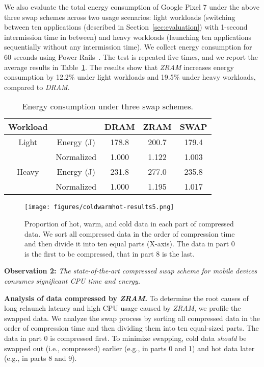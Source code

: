 We also evaluate the total energy consumption of Google Pixel 7 under the above three swap schemes across two usage scenarios: light workloads (switching between ten applications (described in Section~\ref{sec:evaluation}) with 1-second intermission time in between) and heavy workloads (launching ten applications sequentially without any intermission time). We collect energy consumption for 60 seconds using Power Rails~\cite{power-profiler}. The test is repeated five times, and we report the average results in Table~\ref{tab:energy}. The results show that  \emph{ZRAM} increases energy consumption by 12.2\% under light workloads and 19.5\% under heavy workloads, compared to \emph{DRAM}.
 
\begin{table}[h!]
\centering
\caption{Energy consumption under three swap schemes.}
\footnotesize
\begin{tabular}{c||c|c|c|c}
\hline
\textbf{Workload} & & \textbf{DRAM}& \textbf{ZRAM}& \textbf{SWAP}\\ \hline
\hline
Light &Energy (J)&178.8 &200.7&179.4\\
&Normalized&1.000&1.122&1.003\\
\hline
Heavy &Energy (J)&231.8 &277.0&235.8\\
&Normalized& 1.000&1.195&1.017\\
\hline
\end{tabular}
\label{tab:energy}
\end{table}


\begin{figure*}[!h]
\centering
\texttt{[image: figures/coldwarmhot-results5.png]}
\caption{Proportion of hot, warm, and cold data in each part of compressed data. We sort all compressed data in the order of compression time and then divide it into ten equal parts (X-axis). The data in part 0 is the first to be compressed, that in part 8 is the last.}
\label{fig:coldwarmhot}
\end{figure*}

\noindent\textbf{Observation 2:} \textit{The state-of-the-art compressed swap scheme for mobile devices consumes significant CPU time and energy.}

\noindent\textbf{Analysis of data compressed by \emph{ZRAM}.}
To determine the root causes of long relaunch latency and high CPU usage caused by  \emph{ZRAM}, we profile the swapped data. 
We analyze the swap process by sorting all compressed data in the order of compression time and then dividing them into ten equal-sized parts.
The data in part 0 is compressed first. To minimize swapping, cold data \emph{should} be swapped out (i.e., compressed) earlier (e.g., in parts 0 and 1) and hot data later (e.g., in parts 8 and 9).


